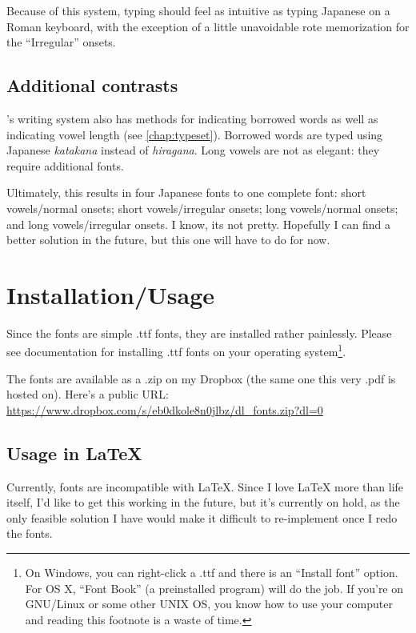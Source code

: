 	Because of this system, typing {\kurango} should feel as intuitive as typing Japanese on a Roman keyboard, with the exception of a little unavoidable rote memorization for the ``Irregular'' onsets.

	\subsection{Additional contrasts}
		\kurango's writing system also has methods for indicating borrowed words as well as indicating vowel length (see \autoref{chap:typeset}). Borrowed words are typed using Japanese \emph{katakana} instead of \emph{hiragana}. Long vowels are not as elegant: they require additional fonts.

		Ultimately, this results in four Japanese fonts to one complete {\kurango} font: short vowels/normal onsets; short vowels/irregular onsets; long vowels/normal onsets; and long vowels/irregular onsets. I know, its not pretty. Hopefully I can find a better solution in the future, but this one will have to do for now.

\section{Installation/Usage}
	Since the {\kurango} fonts are simple .ttf fonts, they are installed rather painlessly. Please see documentation for installing .ttf fonts on your operating system\footnote{On Windows, you can right-click a .ttf and there is an ``Install font'' option. For OS X, ``Font Book'' (a preinstalled program) will do the job. If you're on GNU/Linux or some other UNIX OS, you know how to use your computer and reading this footnote is a waste of time.}.

	The fonts are available as a .zip on my Dropbox (the same one this very .pdf is hosted on). Here's a public URL: \url{https://www.dropbox.com/s/eb0dkole8n0jlbz/dl_fonts.zip?dl=0}

	\subsection{Usage in \LaTeX}
		Currently, {\kurango} fonts are incompatible with \LaTeX. Since I love {\LaTeX} more than life itself, I'd like to get this working in the future, but it's currently on hold, as the only feasible solution I have would make it difficult to re-implement once I redo the fonts.
